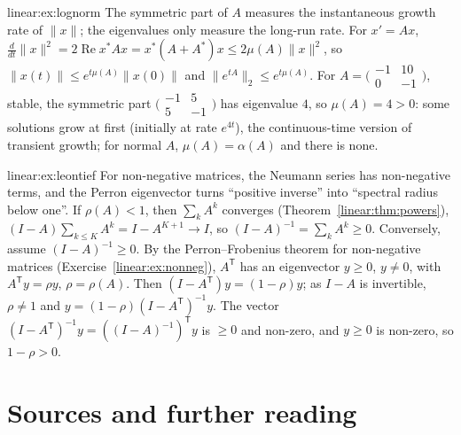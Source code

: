 \begin{solution}{linear:ex:lognorm}
\idea The symmetric part of $A$ measures the instantaneous growth rate of $\|x\|$; the eigenvalues only measure the long-run rate.
\writeup For $x'=Ax$, $\frac d{dt}\|x\|^2=2\operatorname{Re}x^*Ax=x^*(A+A^*)x\le2\mu(A)\|x\|^2$, so $\|x(t)\|\le e^{t\mu(A)}\|x(0)\|$ and $\|e^{tA}\|_2\le
e^{t\mu(A)}$. For $A=\bigl(\begin{smallmatrix}-1&10\\0&-1\end{smallmatrix}\bigr)$, stable, the symmetric part $\bigl(\begin{smallmatrix}-1&5\\5&-1\end{smallmatrix}
\bigr)$ has eigenvalue $4$, so $\mu(A)=4>0$: some solutions grow at first (initially at rate $e^{4t}$), the continuous-time version of
transient growth; for normal $A$, $\mu(A)=\alpha(A)$ and there is none.
\end{solution}

\begin{solution}{linear:ex:leontief}
\idea For non-negative matrices, the Neumann series has non-negative terms, and the Perron eigenvector turns ``positive inverse'' into
``spectral radius below one''.
\writeup If $\rho(A)<1$, then $\sum_kA^k$ converges (Theorem~\ref{linear:thm:powers}), $(I-A)\sum_{k\le K}A^k=I-A^{K+1}\to I$, so $(I-A)^{-1}=\sum_kA^k\ge0$.
Conversely, assume $(I-A)^{-1}\ge0$. By the Perron--Frobenius theorem for non-negative matrices (Exercise~\ref{linear:ex:nonneg}), $A^{\mathsf T}$ has an
eigenvector $y\ge0$, $y\ne0$, with $A^{\mathsf T}y=\rho y$, $\rho=\rho(A)$. Then $(I-A^{\mathsf T})y=(1-\rho)y$; as $I-A$ is invertible, $\rho\ne1$ and
$y=(1-\rho)(I-A^{\mathsf T})^{-1}y$. The vector $(I-A^{\mathsf T})^{-1}y=((I-A)^{-1})^{\mathsf T}y$ is $\ge0$ and non-zero, and $y\ge0$ is non-zero, so
$1-\rho>0$.
\end{solution}

\section*{Sources and further reading}

